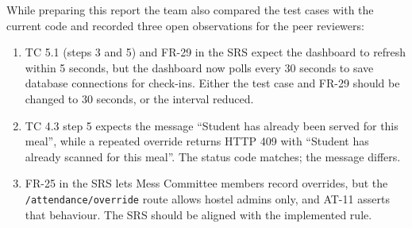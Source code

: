 \documentclass[11pt,a4paper]{article}
\begin{document}
While preparing this report the team also compared the test cases with the
current code and recorded three open observations for the peer reviewers:
\begin{enumerate}
  \item TC 5.1 (steps 3 and 5) and FR-29 in the SRS expect the dashboard to
  refresh within 5 seconds, but the dashboard now polls every 30 seconds to save
  database connections for check-ins. Either the test case and FR-29 should be
  changed to 30 seconds, or the interval reduced.
  \item TC 4.3 step 5 expects the message ``Student has already been served for
  this meal'', while a repeated override returns HTTP 409 with ``Student has
  already scanned for this meal''. The status code matches; the message differs.
  \item FR-25 in the SRS lets Mess Committee members record overrides, but the
  \texttt{/attendance/override} route allows hostel admins only, and AT-11
  asserts that behaviour. The SRS should be aligned with the implemented rule.
\end{enumerate}
\end{document}
